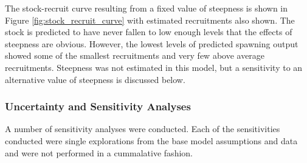 \documentclass[12pt,]{article}
\begin{document}
The stock-recruit curve resulting from a fixed value of steepness is
shown in Figure \ref{fig:stock_recruit_curve} with estimated
recruitments also shown. The stock is predicted to have never fallen to
low enough levels that the effects of steepness are obvious. However,
the lowest levels of predicted spawning output showed some of the
smallest recruitments and very few above average recruitments. Steepness
was not estimated in this model, but a sensitivity to an alternative
value of steepness is discussed below.

\subsubsection{Uncertainty and Sensitivity
Analyses}\label{uncertainty-and-sensitivity-analyses}

A number of sensitivity analyses were conducted. Each of the
sensitivities conducted were single explorations from the base model
assumptions and data and were not performed in a cummalative fashion.
\end{document}
